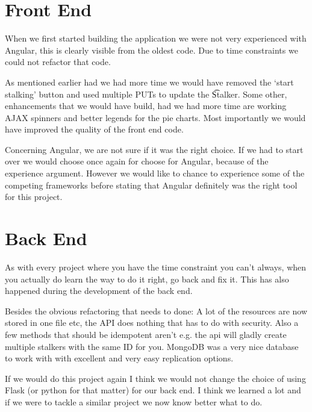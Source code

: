 
\section{Front End}
	When we first started building the application we were not very experienced with Angular, this is clearly visible from the oldest code. Due to time constraints we could not refactor that code. 

	As mentioned earlier had we had more time we would have removed the `start stalking' button and  used multiple PUTs to update the \t{Stalker}. Some other, enhancements that we would have build, had we had more time are working AJAX spinners and better legends for the pie charts. Most importantly we would have improved the quality of the front end code. 

	Concerning Angular, we are not sure if it was the right choice. If we had to start over we would choose once again for choose for Angular, because of the experience argument. However we would like to chance to experience some of the competing frameworks before stating that Angular definitely was the right tool for this project.

\section{Back End}
	As with every project where you have the time constraint you can't always, when you actually do learn the way to do it right, go back and fix it. This has also happened during the development of the back end. 

	Besides the obvious refactoring that needs to done: A lot of the resources are now stored in one file etc, the API does nothing that has to do with security. Also a few methods that should be idempotent aren't e.g. the api will gladly create multiple stalkers with the same ID for you. MongoDB was a very nice database to work with with excellent and very easy replication options. 

	If we would do this project again I think we would not change the choice of using Flask (or python for that matter) for our back end. I think we learned a lot and if we were to tackle a similar project we now know better what to do. 